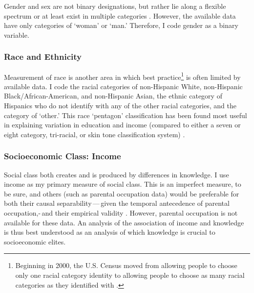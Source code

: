 \documentclass[11pt]{article}
\begin{document}
Gender and sex are not binary designations, but rather lie along a flexible
spectrum or at least exist in multiple categories \citep{Connell2002b,
Fausto-Sterling1993, Fausto-Sterling2000, West1987, Maglioizzi2016}.
However, the available data have only categories of `woman' or
`man.' Therefore, I code gender as a binary variable.

\subsubsection{Race and Ethnicity}\label{sec:race-and-ethnicity}

Measurement of race is another area in which best practice\footnote
  {Beginning in 2000, the U.S. Census moved from allowing people to choose only
  one racial category identity to allowing people to choose as many racial
  categories as they identified with \citep{OfficeofManagementandBudget1997,
  OfficeofManagementandBudget2000}.}
is often limited by available data. I code the racial categories of non-Hispanic
White, non-Hispanic Black/African-American, and non-Hispanic Asian, the ethnic
category of Hispanics who do not identify with any of the other racial
categories, and the category of `other.' This race `pentagon' classification has
been found most useful in explaining variation in education and income (compared
to either a seven or eight category, tri-racial, or skin tone classification
system) \citep{Howell2017}.

\subsubsection{Socioeconomic Class: Income}\label{sec:class-income}

Social class both creates and is produced by differences in knowledge. I use
income as my primary measure of social class. This is an imperfect measure, to
be sure, and others (such as parental occupation data) would be preferable for
both their causal separability\,---\,given the temporal antecedence of parental
occupation,\--\,and their empirical validity \citep{Weeden2005a, Weeden2012}.
However, parental occupation is not available for these data. An analysis of the
association of income and knowledge is thus best understood as an analysis of
which knowledge is crucial to socioeconomic elites.
\end{document}

